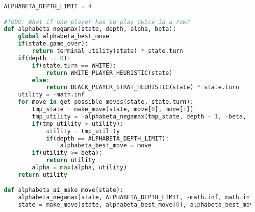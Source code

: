 \begin{lstlisting}[language=Python]
ALPHABETA_DEPTH_LIMIT = 4

#TODO: What if one player has to play twice in a row?
def alphabeta_negamax(state, depth, alpha, beta):
    global alphabeta_best_move
    if(state.game_over):
        return terminal_utility(state) * state.turn
    if(depth == 0):
        if(state.turn == WHITE):
            return WHITE_PLAYER_HEURISTIC(state)
        else:
            return BLACK_PLAYER_STRAT_HEURISTIC(state) * state.turn
    utility = -math.inf
    for move in get_possible_moves(state, state.turn):
        tmp_state = make_move(state, move[0], move[1])
        tmp_utility = -alphabeta_negamax(tmp_state, depth - 1, -beta, -alpha)
        if(tmp_utility > utility):
            utility = tmp_utility
            if(depth == ALPHABETA_DEPTH_LIMIT):
                alphabeta_best_move = move
        if(utility >= beta):
            return utility
        alpha = max(alpha, utility)
    return utility

def alphabeta_ai_make_move(state):
    alphabeta_negamax(state, ALPHABETA_DEPTH_LIMIT, -math.inf, math.inf)
    state = make_move(state, alphabeta_best_move[0], alphabeta_best_move[1])
\end{lstlisting}
